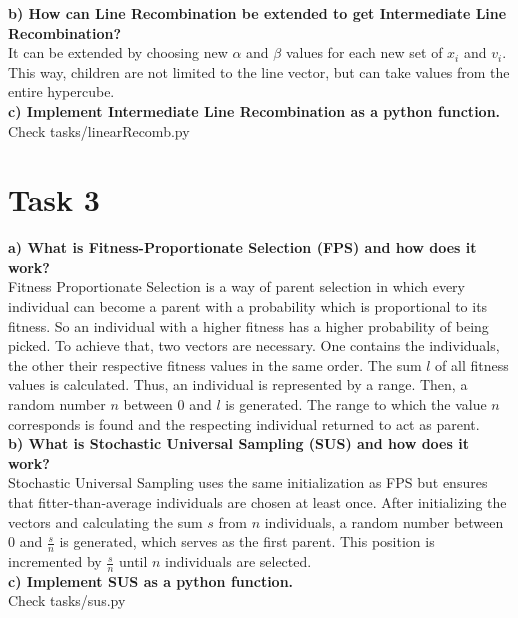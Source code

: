 \documentclass[12pt,letterpaper]{article}
\begin{document}
\textbf{b)  How can Line Recombination be extended to get Intermediate Line Recombination?} \\
It can be extended by choosing new $\alpha$ and $\beta$ values for each new set of $x_{i}$ and $v_{i}$. This way, children are not limited to the line vector, but can take values from the entire hypercube.\\

\textbf{c)  Implement Intermediate Line Recombination as a python function.}\\
Check tasks/linearRecomb.py

\section*{Task 3}
\textbf{a)  What is Fitness-Proportionate Selection (FPS) and how does it work?} \\
Fitness Proportionate Selection is a way of parent selection in which every individual can become a parent with a probability which is proportional to its fitness. So an individual with a higher fitness has a higher probability of being picked. To achieve that, two vectors are necessary. One contains the individuals, the other their respective fitness values in the same order. The sum $l$ of all fitness values is calculated. Thus, an individual is represented by a range. Then, a random number $n$ between 0 and $l$ is generated. The range to which the value $n$ corresponds is found and the respecting individual returned to act as parent.\\

\textbf{b)  What is Stochastic Universal Sampling (SUS) and how does it work?} \\
Stochastic Universal Sampling uses the same initialization as FPS but ensures that fitter-than-average individuals are chosen at least once. After initializing the vectors and calculating the sum $s$ from $n$ individuals, a random number between $0$ and $\frac{s}{n}$ is generated, which serves as the first parent. This position is incremented by $\frac{s}{n}$ until $n$ individuals are selected.\\

\textbf{c)  Implement SUS as a python function.}\\
Check tasks/sus.py
\end{document}
